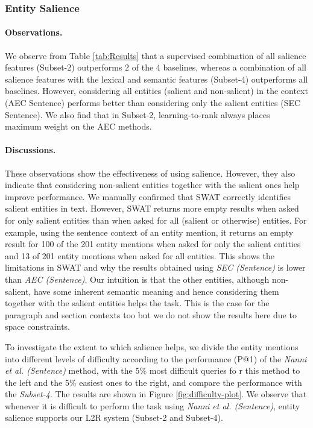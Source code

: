 \subsubsection{Entity Salience}
\label{subsubsec:Entity Salience}
\paragraph{\textbf{Observations.}}
We observe from Table \ref{tab:Results} that a supervised combination of all salience features (Subset-2) outperforms 2 of the 4 baselines, whereas a combination of all salience features with the lexical and semantic features (Subset-4) outperforms all baselines. However, considering all entities (salient and non-salient) in the context (AEC Sentence) performs better than considering only the salient entities (SEC Sentence). We also find that in Subset-2, learning-to-rank always places maximum weight on the AEC methods.
\paragraph{\textbf{Discussions.}}
These observations show the effectiveness of using salience. However, they also indicate that considering non-salient entities together with the salient ones help improve performance. We manually confirmed that SWAT correctly identifies salient entities in text. However, SWAT returns more empty results when asked for only salient entities than when asked for all (salient or otherwise) entities. For example, using the sentence context of an entity mention, it returns an empty result for 100 of the 201 entity mentions when asked for only the salient entities and 13 of 201 entity mentions when asked for all  entities. This shows the limitations in SWAT and why the results obtained using \textit{SEC (Sentence)} is lower than \textit{AEC (Sentence)}.  Our intuition is that the other entities, although non-salient, have some inherent semantic meaning and hence considering them together with the salient entities helps the task. This is the case for the paragraph and section contexts too but we do not show the results here due to space constraints. 

To investigate the extent to which salience helps, we divide the entity mentions  into different levels of difficulty according to the performance (P@1) of the \textit{Nanni et al. (Sentence)} method, with the 5\% most difficult queries fo
r this method to the left and the 5\% easiest ones to the right, and compare the performance with the \textit{Subset-4}. The results are shown in Figure \ref{fig:difficulty-plot}. We observe that whenever it is difficult to perform the task using \textit{Nanni et al. (Sentence)}, entity salience supports our L2R system (Subset-2 and Subset-4).
